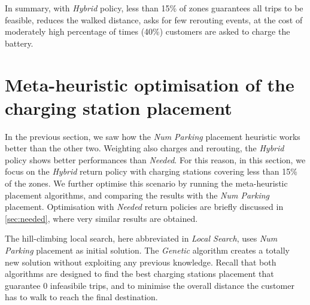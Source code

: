 \documentclass[review, letterpaper,3p, 11pt]{elsarticle}
\begin{document}
In summary, with \textit{Hybrid} policy, less than 15\% of zones guarantees all trips to be feasible, reduces the walked distance, asks for few rerouting events, at the cost of moderately high percentage of times (40\%) customers are asked to charge the battery.





\section{Meta-heuristic optimisation of the charging station placement}
\label{sec:opt}



In the previous section, we saw how the \textit{Num Parking} placement heuristic works better than the other two.
Weighting also charges and rerouting, the \textit{Hybrid} policy shows better performances than \textit{Needed}. For this reason, in this section, we focus on the \textit{Hybrid} return policy with charging stations covering less than 15\% of the zones. We further optimise this scenario by running the meta-heuristic placement algorithms, and comparing the results with the \textit{Num Parking} placement. 
Optimisation with \textit{Needed} return policies are briefly discussed in \ref{sec:needed}, where very similar results are obtained.  

The hill-climbing local search, here abbreviated in \textit{Local Search}, uses \textit{Num Parking} placement as initial solution. The \textit{Genetic} algorithm creates a totally new solution without exploiting any previous knowledge. 
Recall that both algorithms are designed to find the best charging stations placement that guarantee 0 infeasibile trips, and to minimise the overall distance the customer has to walk to reach the final destination.
\end{document}
